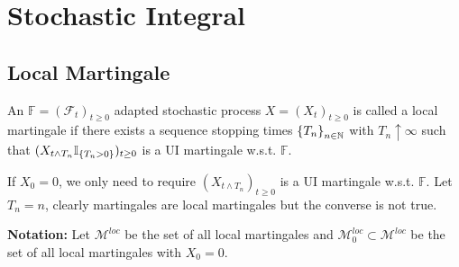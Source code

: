 \chapter{Stochastic Integral}

\section{Local Martingale}

\begin{defn}
    An $\mathbb{F} = (\mathcal{F}_t)_{t \geq 0}$ adapted stochastic process $X=(X_t)_{t \geq 0}$ is called a local martingale if there exists a sequence stopping times $\left\{T_n\right\}_{n \in \mathbb{N}}$ with $T_n \uparrow \infty$ such that $(X_{t \wedge T_n} \mathbb{I}_{\left\{T_n > 0\right\}})_{t \geq 0}$ is a UI martingale w.s.t. $\mathbb{F}$.
\end{defn}
\begin{rmk}
    If $X_0 = 0$, we only need to require $(X_{t \wedge T_n})_{t \geq 0}$ is a UI martingale w.s.t. $\mathbb{F}$. Let $T_n = n$, clearly martingales are local martingales but the converse is not true.
\end{rmk}

\noindent \textbf{Notation:} Let $\mathcal{M}^{loc}$ be the set of all local martingales and $\mathcal{M}^{loc}_0 \subset \mathcal{M}^{loc}$ be the set of all local martingales with $X_0 = 0$.

